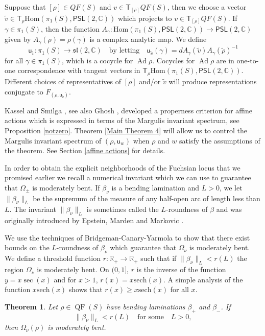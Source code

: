 \documentclass{amsart}
\theoremstyle{plain}
\newtheorem{theorem}[proposition]{Theorem}
\theoremstyle{definition}
\theoremstyle{remark}
\newcommand{\CC}{\mathbb C}
\newcommand{\R}{\mathbb R}
\newcommand{\Ad}{\operatorname{Ad}}
\newcommand{\QF}{\operatorname{QF}}
\newcommand{\sech}{{\mathrm{sech}}}
\newcommand{\PSL}{\mathsf{PSL}}
\renewcommand{\sf}[1]{{\mathsf{#1}}}
\newcommand{\C}{\mathbb C}
\renewcommand{\sl}{\mathfrak{sl}}
\newcommand{\<}{\left <}
\renewcommand{\>}{\right >}
\newcommand{\co}{\sf u}
\renewcommand{\C}{\mathbb C}
\begin{document}
Suppose that $[\rho]\in QF(S)$ and $v\in \sf T_{[\rho]} QF(S)$, then we choose a vector
$\tilde v\in  \sf T_{\rho} \mathrm{Hom}(\pi_1(S),\PSL(2,\CC))$ which projects to $v\in  \sf  T_{[\rho]} QF(S)$.
If $\gamma\in \pi_1(S)$, then the function $A_\gamma:\mathrm{Hom}(\pi_1(S),\PSL(2,\CC))\to\PSL(2,\C)$ given by $A_\gamma(\rho)=\rho(\gamma)$
is a complex analytic map. We define 
$$\co_{\tilde v}:\pi_1(S)\to\sl(2,\C)\quad\text{by letting}\quad \co_{\tilde v}(\gamma)=dA_\gamma(\tilde v) A_\gamma(\tilde\rho)^{-1}$$
for all $\gamma\in\pi_1(S)$, which is a cocycle for $\Ad\rho$. Cocycles for $\Ad\rho$ are in one-to-one correspondence
with tangent vectors in $ \sf T_\rho \mathrm{Hom}(\pi_1(S),\PSL(2,\CC))$. Different choices of representatives of $[\rho]$ and/or $\tilde v$ will produce
representations conjugate to $F_{(\rho,\co_{\tilde v})}$.


Kassel and Smilga \cite{KS}, see also Ghosh \cite{Ghoshdef}, developed a properness criterion for
affine actions which is expressed in terms of the Margulis invariant spectrum, see Proposition \ref{notzero}.
Theorem \ref{Main Theorem 4} will allow us to control the Margulis invariant spectrum of 
$(\rho,\co_w)$ when $\rho$ and $w$ satisfy the assumptions of the theorem. 
See Section \ref{affine actions} for details.


\medskip

In order to obtain the explicit neighborhoods of the Fuchsian locus that we promised earlier we recall a numerical
invariant which we can use to guarantee that $\Omega_\pm$ is moderately bent.
If $\beta_\nu$ is a bending lamination and $L>0$, we let $\|\beta_\nu\|_L$ be the supremum of the measure of any half-open arc of length less than $L$. 
The invariant $\|\beta_\nu\|_L$ is sometimes called the $L$-roundness of $\beta$ and was originally introduced by
Epstein, Marden and Markovic \cite{EMM}.

We use the techniques of Bridgeman-Canary-Yarmola \cite{BCY} to show that there exist bounds on the $L$-roundness of $\beta_\nu$
which guarantee that $\Omega_\nu$ is moderately bent.
We define  a threshold function  $r:\R_+ \rightarrow \R_+$ such that if $\|\beta_\nu\|_L < r(L)$ the  region $\Omega_\nu$ is moderately bent.
On $(0,1]$, $r$ is the inverse of the function $y =x\sec(x)$ and for $x > 1$, $r(x) =x\sech(x)$. 
A simple analysis of the function $x\sech(x)$ shows that $r(x) \geq x\sech(x)$ for all $x$.

\begin{theorem}
\label{Main Theorem 5}
Let $\rho\in \QF(S)$ have bending laminations $\beta_+$ and $\beta_-$.  If 
$$\|\beta_\nu\|_L<r(L)\quad\text{for some}\quad L>0,$$
then $\Omega_\nu(\rho)$ is moderately bent.
\end{theorem}
\end{document}

